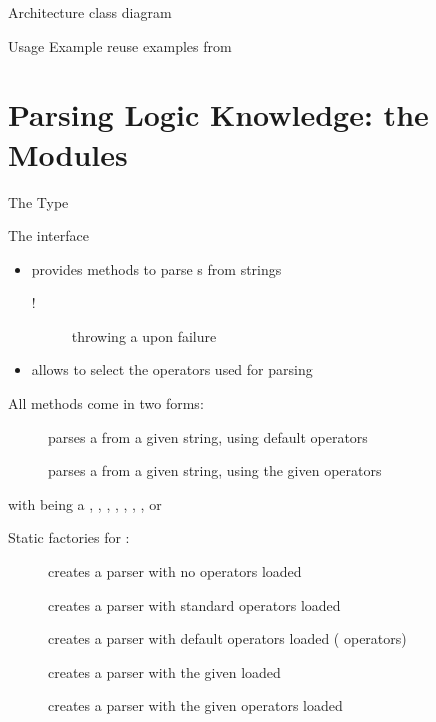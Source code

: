 \documentclass[handout]{beamer}
\begin{document}
\begin{frame}[allowframebreaks]{Architecture}
    class diagram
\end{frame}

\begin{frame}[allowframebreaks]{Usage Example}
    reuse examples from \cite{kotlinDSl4PrologWoa2020}
\end{frame}

\section{Parsing Logic Knowledge: the  Modules}

\begin{frame}[allowframebreaks]{The  Type}

    \begin{block}{The  interface}
        \begin{itemize}
            \item provides methods to parse s from strings
            \begin{description}
                \item[!] throwing a  upon failure 
            \end{description}
            \item allows to select the operators used for parsing
        \end{itemize}
    \end{block}
    All methods come in two forms:
    \begin{description}
        \item[] parses a  from a given string, using default operators
        \item[] parses a  from a given string, using the given operators
    \end{description}
    with  being a , , , , , , ,  or 

    \framebreak

    Static factories for :
    \begin{description}
        \item [] creates a parser with no operators loaded
        \item [] creates a parser with standard operators loaded
        \item [] creates a parser with default operators loaded ( operators)
        \item [] creates a parser with the given  loaded
        \item [] creates a parser with the given operators loaded 
    \end{description}


\end{frame}
\end{document}
